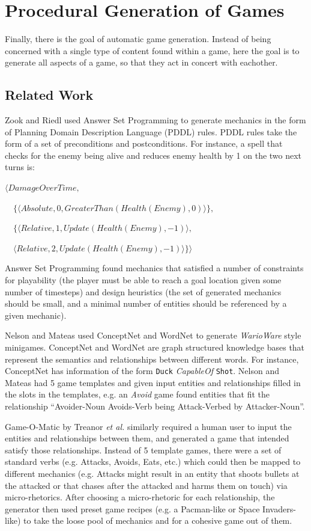 \documentclass[12pt]{report}
\begin{document}
\chapter*{Procedural Generation of Games}

Finally, there is the goal of automatic game generation. Instead of being concerned with a single type of content found within a game, here the goal is to generate all aspects of a game, so that they act in concert with eachother.  


\section*{Related Work}

Zook and Riedl \cite{AGDViaMechanics} used Answer Set Programming to generate mechanics in the form of Planning Domain Description Language (PDDL) rules.  PDDL rules take the form of a set of preconditions and postconditions.  For instance, a spell that checks for the enemy being
alive and reduces enemy health by 1 on the two next turns is:

$\langle DamageOverTime, $

$\quad \{\langle Absolute, 0, GreaterThan(Health(Enemy), 0)\rangle\}, $

$\quad \{\langle Relative, 1, Update(Health(Enemy), -1)\rangle, $

$ \quad  \langle Relative, 2,  Update(Health(Enemy),  -1)\rangle\}\rangle$

Answer Set Programming found mechanics that satisfied a number of constraints for playability (the player must be able to reach a goal location given some number of timesteps) and design heuristics (the set of generated mechanics should be small, and a minimal number of entities should be referenced by a given mechanic).  

Nelson and Mateas \cite{towardsAGD} used ConceptNet \cite{conceptnet} and WordNet \cite{wordnet} to generate \textit{WarioWare} style minigames.  ConceptNet and WordNet are graph structured knowledge bases that represent the semantics and relationships between different words.  For instance, ConceptNet has information of the form \texttt{Duck} \textit{CapableOf} \texttt{Shot}.  Nelson and Mateas had 5 game templates and given input entities and relationships filled in the slots in the templates, e.g. an \textit{Avoid} game found entities that fit the relationship ``Avoider-Noun Avoids-Verb being Attack-Verbed by Attacker-Noun''.  

Game-O-Matic by Treanor \textit{et al.} \cite{gameomatic} similarly required a human user to input the entities and relationships between them, and generated a game that intended satisfy those relationships.  Instead of 5 template games, there were a set of standard verbs (e.g. Attacks, Avoids, Eats, etc.) which could then be mapped to different mechanics (e.g. Attacks might result in an entity that shoots bullets at the attacked or that chases after the attacked and harms them on touch) via micro-rhetorics. After choosing a micro-rhetoric for each relationship, the generator then used preset game recipes (e.g. a Pacman-like or Space Invaders-like) to take the loose pool of mechanics and for a cohesive game out of them. 
\end{document}
